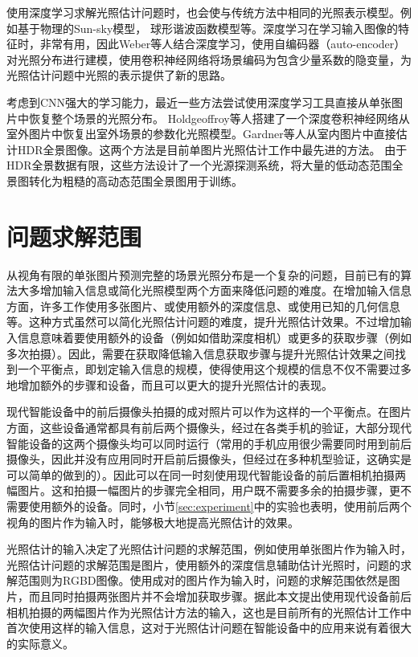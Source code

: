 使用深度学习求解光照估计问题时，也会使与传统方法中相同的光照表示模型。例如基于物理的Sun-sky模型\cite{hold2017deep}， 球形谐波函数模型\cite{mandl2017learning}等。深度学习在学习输入图像的特征时，非常有用，因此Weber等人\cite{weber2018learning}结合深度学习，使用自编码器（auto-encoder）对光照分布进行建模，使用卷积神经网络将场景编码为包含少量系数的隐变量，为光照估计问题中光照的表示提供了新的思路。

考虑到CNN强大的学习能力，最近一些方法尝试使用深度学习工具直接从单张图片中恢复整个场景的光照分布。
Holdgeoffroy等人\cite{hold2017deep}搭建了一个深度卷积神经网络从室外图片中恢复出室外场景的参数化光照模型。Gardner等人\cite{gardner2017learning}从室内图片中直接估计HDR全景图像。这两个方法是目前单图片光照估计工作中最先进的方法。
由于HDR全景数据有限，这些方法设计了一个光源探测系统，将大量的低动态范围全景图转化为粗糙的高动态范围全景图用于训练。

\section{问题求解范围}
从视角有限的单张图片预测完整的场景光照分布是一个复杂的问题，目前已有的算法大多增加输入信息或简化光照模型两个方面来降低问题的难度。在增加输入信息方面，许多工作使用多张图片、或使用额外的深度信息、或使用已知的几何信息等。这种方式虽然可以简化光照估计问题的难度，提升光照估计效果。不过增加输入信息意味着要使用额外的设备（例如如借助深度相机）或更多的获取步骤（例如多次拍摄）。因此，需要在获取降低输入信息获取步骤与提升光照估计效果之间找到一个平衡点，即划定输入信息的规模，使得使用这个规模的信息不仅不需要过多地增加额外的步骤和设备，而且可以更大的提升光照估计的表现。

现代智能设备中的前后摄像头拍摄的成对照片可以作为这样的一个平衡点。在图片方面，这些设备通常都具有前后两个摄像头，经过在各类手机的验证，大部分现代智能设备的这两个摄像头均可以同时运行（常用的手机应用很少需要同时用到前后摄像头，因此并没有应用同时开启前后摄像头，但经过在多种机型验证，这确实是可以简单的做到的）。因此可以在同一时刻使用现代智能设备的前后置相机拍摄两幅图片。这和拍摄一幅图片的步骤完全相同，用户既不需要多余的拍摄步骤，更不需要使用额外的设备。同时，小节\ref{sec:experiment}中的实验也表明，使用前后两个视角的图片作为输入时，能够极大地提高光照估计的效果。

光照估计的输入决定了光照估计问题的求解范围，例如使用单张图片作为输入时，光照估计问题的求解范围是图片，使用额外的深度信息辅助估计光照时，问题的求解范围则为RGBD图像。使用成对的图片作为输入时，问题的求解范围依然是图片，而且同时拍摄两张图片并不会增加获取步骤。据此本文提出使用现代设备前后相机拍摄的两幅图片作为光照估计方法的输入，这也是目前所有的光照估计工作中首次使用这样的输入信息，这对于光照估计问题在智能设备中的应用来说有着很大的实际意义。

